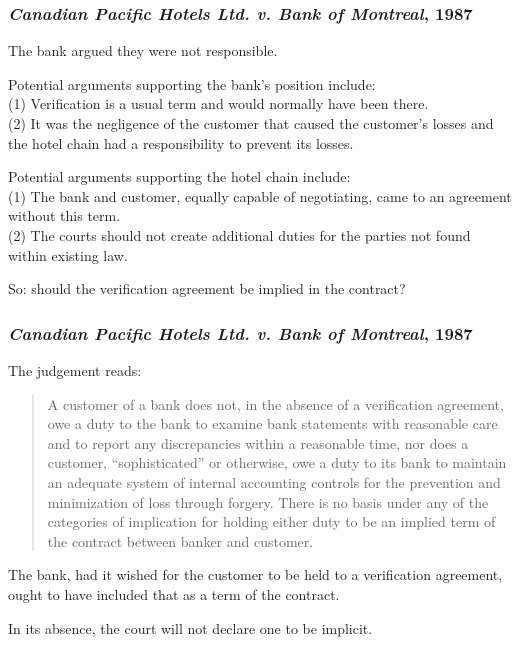 \begin{frame}
\frametitle{\textit{Canadian Pacific Hotels Ltd. v. Bank of Montreal}, 1987}

The bank argued they were not responsible.

Potential arguments supporting the bank's position include:\\
\quad (1) Verification is a usual term and would normally have been there.\\
\quad (2) It was the negligence of the customer that caused the customer's losses and the hotel chain had a responsibility to prevent its losses.

Potential arguments supporting the hotel chain include:\\
\quad (1) The bank and customer, equally capable of negotiating, came to an agreement without this term.\\
\quad (2) The courts should not create additional duties for the parties not found within existing law.

So: should the verification agreement be implied in the contract?

\end{frame}



\begin{frame}
\frametitle{\textit{Canadian Pacific Hotels Ltd. v. Bank of Montreal}, 1987}


The judgement reads:

\begin{quote}
A customer of a bank does not, in the absence of a verification agreement, owe a duty to the bank to examine bank statements with reasonable care and to report any discrepancies within a reasonable time, nor does a customer, ``sophisticated'' or otherwise, owe a duty to its bank to maintain an adequate system of internal accounting controls for the prevention and minimization of loss through forgery. There is no basis under any of the categories of implication for holding either duty to be an implied term of the contract between banker and customer.
\end{quote}

The bank, had it wished for the customer to be held to a verification agreement, ought to have included that as a term of the contract.

In its absence, the court will not declare one to be implicit.


\end{frame}





